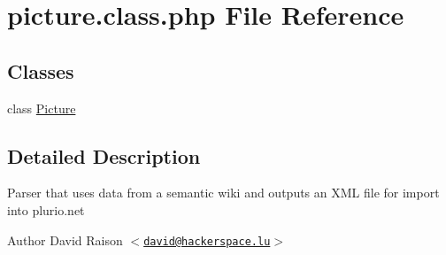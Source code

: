 \hypertarget{picture_8class_8php}{
\section{picture.class.php File Reference}
\label{picture_8class_8php}
}
\subsection*{Classes}
\begin{DoxyCompactItemize}
\item 
class \hyperlink{classPicture}{Picture}
\end{DoxyCompactItemize}


\subsection{Detailed Description}
Parser that uses data from a semantic wiki and outputs an XML file for import into plurio.net

\begin{DoxyAuthor}{Author}
David Raison $<$\href{mailto:david@hackerspace.lu}{\tt david@hackerspace.lu}$>$ 
\end{DoxyAuthor}
